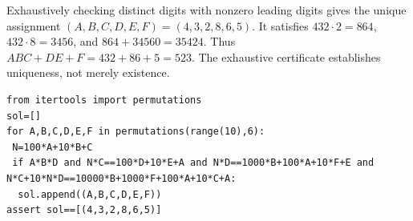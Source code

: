 Exhaustively checking distinct digits with nonzero leading digits gives the unique assignment $(A,B,C,D,E,F)=(4,3,2,8,6,5)$. It satisfies $432\cdot2=864$, $432\cdot8=3456$, and $864+34560=35424$. Thus $ABC+DE+F=432+86+5=\boxed{523}$. The exhaustive certificate establishes uniqueness, not merely existence.
\begin{verbatim}
from itertools import permutations
sol=[]
for A,B,C,D,E,F in permutations(range(10),6):
 N=100*A+10*B+C
 if A*B*D and N*C==100*D+10*E+A and N*D==1000*B+100*A+10*F+E and N*C+10*N*D==10000*B+1000*F+100*A+10*C+A:
  sol.append((A,B,C,D,E,F))
assert sol==[(4,3,2,8,6,5)]
\end{verbatim}
